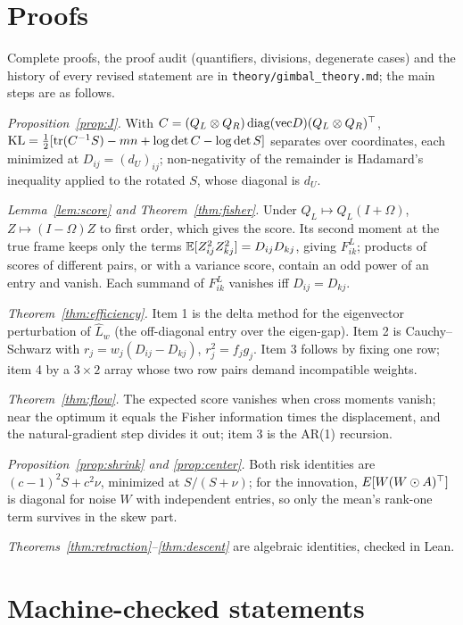 \section{Proofs}
\label{app:proofs}

Complete proofs, the proof audit (quantifiers, divisions, degenerate cases) and the history of every
revised statement are in \texttt{theory/gimbal\_theory.md}; the main steps are as follows.

\emph{Proposition~\ref{prop:J}.} With $C=(Q_L\otimes Q_R)\operatorname{diag}(\mathrm{vec}D)(Q_L\otimes Q_R)^\top$,
$\mathrm{KL}=\frac12[\operatorname{tr}(C^{-1}S)-mn+\log\det C-\log\det S]$ separates over coordinates, each
minimized at $D_{ij}=(d_U)_{ij}$; non-negativity of the remainder is Hadamard's inequality applied
to the rotated $S$, whose diagonal is $d_U$.

\emph{Lemma~\ref{lem:score} and Theorem~\ref{thm:fisher}.} Under $Q_L\mapsto Q_L(I+\Omega)$,
$Z\mapsto(I-\Omega)Z$ to first order, which gives the score. Its second moment at the true frame
keeps only the terms $\mathbb{E}[Z_{ij}^2Z_{kj}^2]=D_{ij}D_{kj}$, giving $F^L_{ik}$; products of scores of
different pairs, or with a variance score, contain an odd power of an entry and vanish. Each
summand of $F^L_{ik}$ vanishes iff $D_{ij}=D_{kj}$.

\emph{Theorem~\ref{thm:efficiency}.} Item 1 is the delta method for the eigenvector perturbation of
$\hat L_w$ (the off-diagonal entry over the eigen-gap). Item 2 is Cauchy--Schwarz with
$r_j=w_j(D_{ij}-D_{kj})$, $r_j^2=f_jg_j$. Item 3 follows by fixing one row; item 4 by a $3\times2$
array whose two row pairs demand incompatible weights.

\emph{Theorem~\ref{thm:flow}.} The expected score vanishes when cross moments vanish; near the
optimum it equals the Fisher information times the displacement, and the natural-gradient step
divides it out; item 3 is the AR(1) recursion.

\emph{Proposition~\ref{prop:shrink} and \ref{prop:center}.} Both risk identities are
$(c-1)^2S+c^2\nu$, minimized at $S/(S+\nu)$; for the innovation, $E[W(W\odot A)^\top]$ is diagonal for
noise $W$ with independent entries, so only the mean's rank-one term survives in the skew part.

\emph{Theorems~\ref{thm:retraction}--\ref{thm:descent}} are algebraic identities, checked in Lean.

\section{Machine-checked statements}
\label{app:lean}

